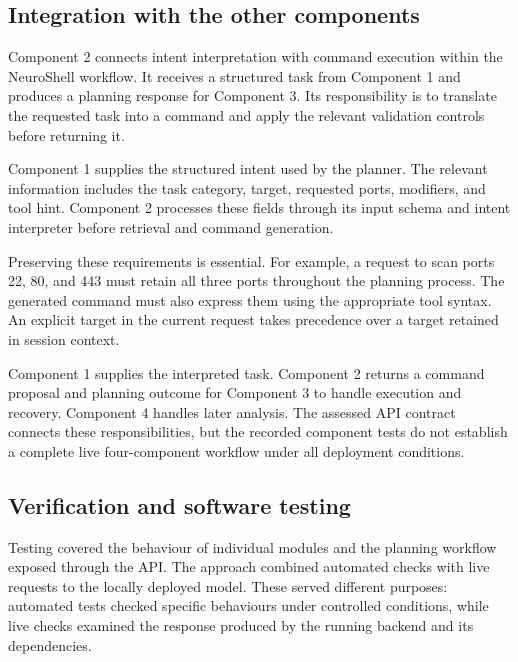 \documentclass[
]{article}
\begin{document}
\hypertarget{integration-with-the-other-components}{%
\subsection{\texorpdfstring{ Integration with the other
components}{ Integration with the other components}}\label{integration-with-the-other-components}}

Component 2 connects intent interpretation with command execution within
the NeuroShell workflow. It receives a structured task from Component 1
and produces a planning response for Component 3. Its responsibility is
to translate the requested task into a command and apply the relevant
validation controls before returning it.

Component 1 supplies the structured intent used by the planner. The
relevant information includes the task category, target, requested
ports, modifiers, and tool hint. Component 2 processes these fields
through its input schema and intent interpreter before retrieval and
command generation.

Preserving these requirements is essential. For example, a request to
scan ports 22, 80, and 443 must retain all three ports throughout the
planning process. The generated command must also express them using the
appropriate tool syntax. An explicit target in the current request takes
precedence over a target retained in session context.

Component 1 supplies the interpreted task. Component 2 returns a command
proposal and planning outcome for Component 3 to handle execution and
recovery. Component 4 handles later analysis. The assessed API contract
connects these responsibilities, but the recorded component tests do not
establish a complete live four-component workflow under all deployment
conditions.

\hypertarget{verification-and-software-testing}{%
\subsection{\texorpdfstring{ Verification and software
testing}{ Verification and software testing}}\label{verification-and-software-testing}}

Testing covered the behaviour of individual modules and the planning
workflow exposed through the API. The approach combined automated checks
with live requests to the locally deployed model. These served different
purposes: automated tests checked specific behaviours under controlled
conditions, while live checks examined the response produced by the
running backend and its dependencies.
\end{document}
